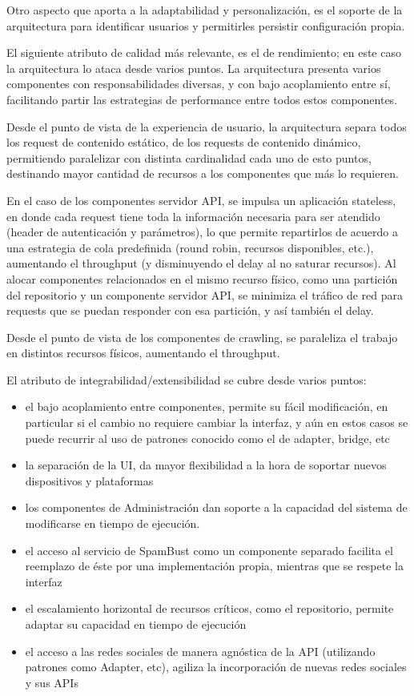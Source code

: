 Otro aspecto que aporta a la adaptabilidad y personalizaci\'on, es el soporte de la arquitectura para identificar usuarios y permitirles persistir configuraci\'on propia.

El siguiente atributo de calidad m\'as relevante, es el de rendimiento; en este caso la arquitectura lo ataca desde varios puntos. La arquitectura presenta varios componentes con responsabilidades diversas, y con bajo acoplamiento entre s\'i, facilitando partir las estrategias de performance entre todos estos componentes.

Desde el punto de vista de la experiencia de usuario, la arquitectura separa todos los request de contenido est\'atico, de los requests de contenido din\'amico, permitiendo paralelizar con distinta cardinalidad cada uno de esto puntos, destinando mayor cantidad de recursos a los componentes que m\'as lo requieren. 

En el caso de los componentes servidor API, se impulsa un aplicaci\'on stateless, en donde cada request tiene toda la informaci\'on necesaria para ser atendido (header de autenticaci\'on y par\'ametros), lo que permite repartirlos de acuerdo a una estrategia de cola predefinida (round robin, recursos disponibles, etc.), aumentando el throughput (y disminuyendo el delay al no saturar recursos). Al alocar componentes relacionados en el mismo recurso f\'isico, como una partici\'on del repositorio y un componente servidor API, se minimiza el tr\'afico de red para requests que se puedan responder con esa partici\'on, y as\'i tambi\'en el delay.

Desde el punto de vista de los componentes de crawling, se paraleliza el trabajo en distintos recursos f\'isicos, aumentando el throughput.

El atributo de integrabilidad/extensibilidad se cubre desde varios puntos:

\begin{itemize}
\item el bajo acoplamiento entre componentes, permite su f\'acil modificaci\'on, en particular si el cambio no requiere cambiar la interfaz, y a\'un en estos casos se puede recurrir al uso de patrones conocido como el de adapter, bridge, etc
\item la separaci\'on de la UI, da mayor flexibilidad a la hora de soportar nuevos dispositivos y plataformas
\item los componentes de Administraci\'on dan soporte a la capacidad del sistema de modificarse en tiempo de ejecuci\'on.
\item el acceso al servicio de SpamBust como un componente separado facilita el reemplazo de \'este por una implementaci\'on propia, mientras que se respete la interfaz
\item el escalamiento horizontal de recursos cr\'iticos, como el repositorio, permite adaptar su capacidad en tiempo de ejecuci\'on
\item el acceso a las redes sociales de manera agn\'ostica de la API (utilizando patrones como Adapter, etc), agiliza la incorporaci\'on de nuevas redes sociales y sus APIs
\end{itemize}
  
